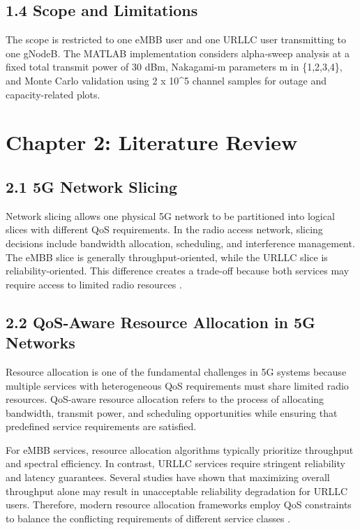 \documentclass[
]{article}
\begin{document}
\subsection{1.4 Scope and Limitations}\label{scope-and-limitations}

The scope is restricted to one eMBB user and one URLLC user transmitting
to one gNodeB. The MATLAB implementation considers alpha-sweep analysis
at a fixed total transmit power of 30 dBm, Nakagami-m parameters
m in \{1,2,3,4\}, and Monte Carlo validation using 2 x 10\^{}5 channel
samples for outage and capacity-related plots.

\clearpage

\section{Chapter 2: Literature
Review}\label{chapter-2-literature-review}

\subsection{2.1 5G Network Slicing}\label{g-network-slicing}

Network slicing allows one physical 5G network to be partitioned into
logical slices with different QoS requirements. In the radio access
network, slicing decisions include bandwidth allocation, scheduling, and
interference management. The eMBB slice is generally
throughput-oriented, while the URLLC slice is reliability-oriented. This
difference creates a trade-off because both services may require access
to limited radio resources \parencite{Zhang2017}.

\subsection{2.2 QoS-Aware Resource Allocation in 5G
Networks}\label{qos-aware-resource-allocation-in-5g-networks}

Resource allocation is one of the fundamental challenges in 5G systems
because multiple services with heterogeneous QoS requirements must share
limited radio resources. QoS-aware resource allocation refers to the
process of allocating bandwidth, transmit power, and scheduling
opportunities while ensuring that predefined service requirements are
satisfied.

For eMBB services, resource allocation algorithms typically prioritize
throughput and spectral efficiency. In contrast, URLLC services require
stringent reliability and latency guarantees. Several studies have shown
that maximizing overall throughput alone may result in unacceptable
reliability degradation for URLLC users. Therefore, modern resource
allocation frameworks employ QoS constraints to balance the conflicting
requirements of different service classes \parencite{Zhang2017}.
\end{document}
